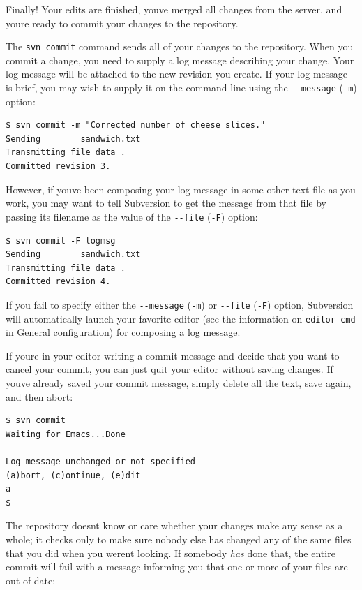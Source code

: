 Finally! Your edits are finished, you\textquotesingle ve merged all
changes from the server, and you\textquotesingle re ready to commit your
changes to the repository.

The \texttt{svn\ commit} command sends all of your changes to the
repository. When you commit a change, you need to supply a log message
describing your change. Your log message will be attached to the new
revision you create. If your log message is brief, you may wish to
supply it on the command line using the \texttt{-\/-message}
(\texttt{-m}) option:

\begin{verbatim}
$ svn commit -m "Corrected number of cheese slices."
Sending        sandwich.txt
Transmitting file data .
Committed revision 3.
\end{verbatim}

However, if you\textquotesingle ve been composing your log message in
some other text file as you work, you may want to tell Subversion to get
the message from that file by passing its filename as the value of the
\texttt{-\/-file} (\texttt{-F}) option:

\begin{verbatim}
$ svn commit -F logmsg
Sending        sandwich.txt
Transmitting file data .
Committed revision 4.
\end{verbatim}

If you fail to specify either the \texttt{-\/-message} (\texttt{-m}) or
\texttt{-\/-file} (\texttt{-F}) option, Subversion will automatically
launch your favorite editor (see the information on \texttt{editor-cmd}
in \hyperref[svn.advanced.confarea.opts.config]{General configuration})
for composing a log message.

If you\textquotesingle re in your editor writing a commit message and
decide that you want to cancel your commit, you can just quit your
editor without saving changes. If you\textquotesingle ve already saved
your commit message, simply delete all the text, save again, and then
abort:

\begin{verbatim}
$ svn commit
Waiting for Emacs...Done

Log message unchanged or not specified
(a)bort, (c)ontinue, (e)dit
a
$
\end{verbatim}

The repository doesn\textquotesingle t know or care whether your changes
make any sense as a whole; it checks only to make sure nobody else has
changed any of the same files that you did when you
weren\textquotesingle t looking. If somebody \emph{has} done that, the
entire commit will fail with a message informing you that one or more of
your files are out of date:

